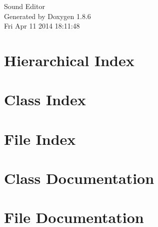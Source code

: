 \documentclass[twoside]{book}
\newcommand{\clearemptydoublepage}{%
  \newpage{\pagestyle{empty}\cleardoublepage}%
}
\begin{document}
\hypersetup{pageanchor=false}
\begin{titlepage}
\vspace*{7cm}
\begin{center}%
{\Large Sound Editor }\\
\vspace*{1cm}
{\large Generated by Doxygen 1.8.6}\\
\vspace*{0.5cm}
{\small Fri Apr 11 2014 18:11:48}\\
\end{center}
\end{titlepage}
\clearemptydoublepage
\tableofcontents
\clearemptydoublepage
{}
\hypersetup{pageanchor=true}

\chapter{Hierarchical Index}

\chapter{Class Index}

\chapter{File Index}

\chapter{Class Documentation}












\chapter{File Documentation}















\newpage
{}
{}
\printindex
\end{document}

